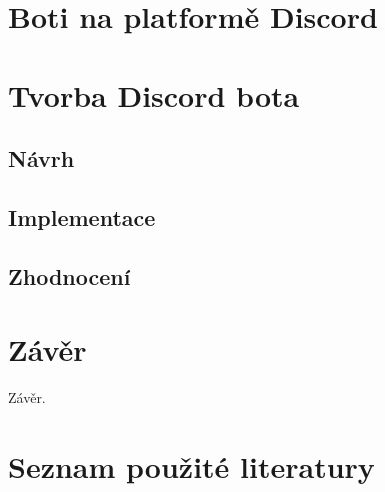 \documentclass[FM]{tulthesis}
\begin{document}
	
	\chapter{Boti na platformě Discord}
	
		
	\chapter{Tvorba Discord bota}
	
	\section{Návrh}
	
	\section{Implementace}
	
	\section{Zhodnocení}
	
	\chapter{Závěr}
	
	Závěr.
	
	\chapter*{Seznam použité literatury}
	\printbibliography[heading=none]
	
\end{document}
